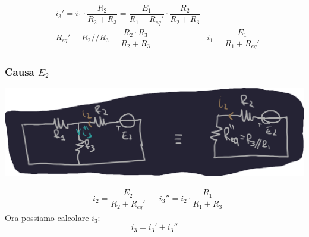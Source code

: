 \documentclass{article}
\begin{document}
\begin{align*}
    &i_3' = i_1 \cdot \dfrac{R_2}{R_2 + R_3} = \dfrac{E_1}{R_1 + R_{eq}'} \cdot \dfrac{R_2}{R_2 + R_3}\\
    &R_{eq}' = R_2 // R_3 = \dfrac{R_2 \cdot R_3}{R_2 + R_3} & i_1 = \dfrac{E_1}{R_1 + R_{eq}'}
\end{align*}

\subsubsection*{Causa \texorpdfstring{$E_2$}{E2}}
\begin{center}
    \includegraphics[scale=0.25]{Image/Esempio_MetAnalisi_3.png}
\end{center}
\begin{align*}
    &i_2 = \dfrac{E_2}{R_2+R_{eq}'} & &i_3'' = i_2 \cdot \dfrac{R_1}{R_1+R_3}
\end{align*}
Ora possiamo calcolare $i_3$:
\[
    i_3 = i_3' + i_3''
\]
\end{document}
